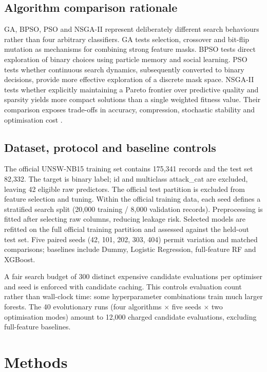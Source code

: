 \documentclass[10pt,a4paper,twocolumn]{extarticle}
\begin{document}
\subsection{Algorithm comparison rationale}
GA, BPSO, PSO and NSGA-II represent deliberately different search behaviours rather than four arbitrary classifiers. GA tests selection, crossover and bit-flip mutation as mechanisms for combining strong feature masks. BPSO tests direct exploration of binary choices using particle memory and social learning. PSO tests whether continuous search dynamics, subsequently converted to binary decisions, provide more effective exploration of a discrete mask space. NSGA-II tests whether explicitly maintaining a Pareto frontier over predictive quality and sparsity yields more compact solutions than a single weighted fitness value. Their comparison exposes trade-offs in accuracy, compression, stochastic stability and optimisation cost \parencite{kennedy1995,kennedy1997,deb2002}.

\subsection{Dataset, protocol and baseline controls}
The official UNSW-NB15 training set contains 175,341 records and the test set 82,332. The target is binary label; id and multiclass attack\_cat are excluded, leaving 42 eligible raw predictors. The official test partition is excluded from feature selection and tuning. Within the official training data, each seed defines a stratified search split (20,000 training / 8,000 validation records). Preprocessing is fitted after selecting raw columns, reducing leakage risk. Selected models are refitted on the full official training partition and assessed against the held-out test set. Five paired seeds (42, 101, 202, 303, 404) permit variation and matched comparisons; baselines include Dummy, Logistic Regression, full-feature RF and XGBoost.

A fair search budget of 300 distinct expensive candidate evaluations per optimiser and seed is enforced with candidate caching. This controls evaluation count rather than wall-clock time: some hyperparameter combinations train much larger forests. The 40 evolutionary runs (four algorithms $\times$ five seeds $\times$ two optimisation modes) amount to 12,000 charged candidate evaluations, excluding full-feature baselines.

\section{Methods}
\end{document}
